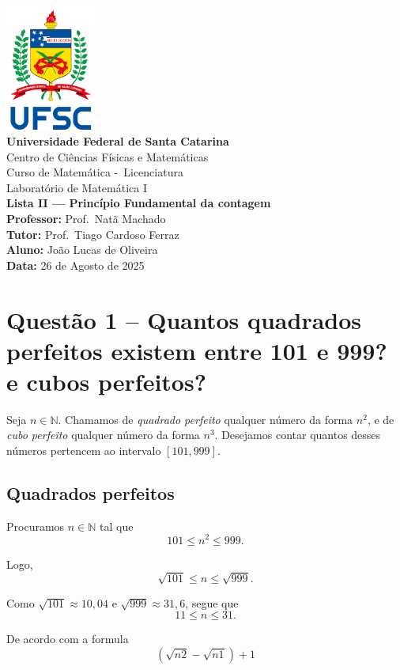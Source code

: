 \documentclass[12pt,a4paper]{article}
\newcommand{\universidade}{Universidade Federal de Santa Catarina}
\newcommand{\centro}{Centro de Ciências Físicas e Matemáticas}
\newcommand{\curso}{Curso de Matemática -\ Licenciatura}
\newcommand{\disciplina}{Laboratório de Matemática I}
\newcommand{\professor}{Prof.\ Natã Machado}
\newcommand{\tutora}{Prof.\ Tiago Cardoso Ferraz}
\newcommand{\autor}{João Lucas de Oliveira}
\newcommand{\dataentrega}{26 de Agosto de 2025}
\begin{document}
\begin{center}
    \includegraphics[width=3cm]{ufsc_logo}\\[0.3cm]
    \textbf{\universidade}\\
    \centro\\
    \curso\\[1cm]
    \disciplina\\
    \textbf{Lista II — Princípio Fundamental da contagem}\\[0.5cm]
    \textbf{Professor:} \professor\\
    \textbf{Tutor:} \tutora\\
    \textbf{Aluno:} \autor\\
    \textbf{Data:} \dataentrega\\
\end{center}

\vspace{1cm}

\section*{Questão 1 -- Quantos quadrados perfeitos existem entre 101 e 999? e cubos perfeitos?}

    Seja $n \in \mathbb{N}$. Chamamos de \emph{quadrado perfeito} qualquer número da forma $n^2$, e de \emph{cubo perfeito} qualquer número da forma $n^3$. Desejamos contar quantos desses números pertencem ao intervalo $[101,999]$.

    \subsection*{Quadrados perfeitos}

    Procuramos $n \in \mathbb{N}$ tal que
    \[
    101 \leq n^2 \leq 999.
    \]

    Logo,
    \[
    \sqrt{101} \leq n \leq \sqrt{999}.
    \]

    Como $\sqrt{101} \approx 10{,}04$ e $\sqrt{999} \approx 31{,}6$, segue que
    \[
    11 \leq n \leq 31.
    \]

    De acordo com a formula
    \[
    \boxed{\left(\sqrt{n2} - \sqrt{n1}\right) + 1}
    \]
\end{document}

